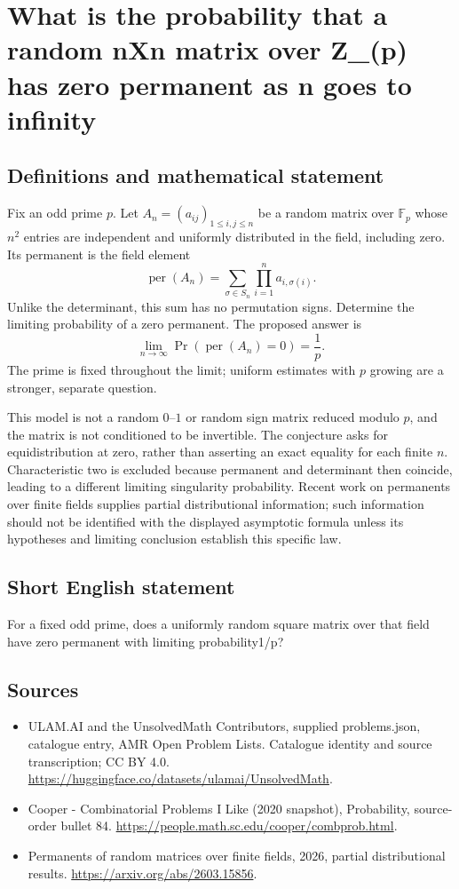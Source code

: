 \documentclass[11pt,a4paper]{article}
\begin{document}
\section*{What is the probability that a random nXn matrix over Z\_(p) has zero permanent as n goes to infinity}\label{statement}

\subsection{Definitions and mathematical statement}
Fix an odd prime $p$. Let $A_n=(a_{ij})_{1\le i,j\le n}$ be a
random matrix over $\mathbb F_p$ whose $n^2$ entries are independent
and uniformly distributed in the field, including zero.
Its permanent is the field element
\[
           \operatorname{per}(A_n)
               =\sum_{\sigma\in S_n}\prod_{i=1}^n a_{i,\sigma(i)}.
\]
Unlike the determinant, this sum has no permutation signs.
Determine the limiting probability of a zero permanent.
The proposed answer is
\[
             \lim_{n\to\infty}
                    \Pr(\operatorname{per}(A_n)=0)=\frac1p.
\]
The prime is fixed throughout the limit; uniform estimates with
$p$ growing are a stronger, separate question.

This model is not a random $0$--$1$ or random sign matrix reduced
modulo $p$, and the matrix is not conditioned to be invertible.
The conjecture asks for equidistribution at zero, rather than
asserting an exact equality for each finite $n$. Characteristic
two is excluded because permanent and determinant then coincide,
leading to a different limiting singularity probability.
Recent work on permanents over finite fields supplies partial
distributional information; such information should not be
identified with the displayed asymptotic formula unless its
hypotheses and limiting conclusion establish this specific law.
\subsection{Short English statement}
For a fixed odd prime, does a uniformly random square matrix over that field have zero permanent with limiting probability1/p?
\subsection{Sources}
\begin{itemize}
\item[S1] ULAM.AI and the UnsolvedMath Contributors, supplied problems.json, catalogue entry, AMR Open Problem Lists. Catalogue identity and source transcription; CC BY 4.0.
\url{https://huggingface.co/datasets/ulamai/UnsolvedMath}.
\item[S2] Cooper - Combinatorial Problems I Like (2020 snapshot), Probability, source-order bullet 84. 
\url{https://people.math.sc.edu/cooper/combprob.html}.
\item[S3] Permanents of random matrices over finite fields, 2026, partial distributional results.
\url{https://arxiv.org/abs/2603.15856}.
\end{itemize}
\end{document}
